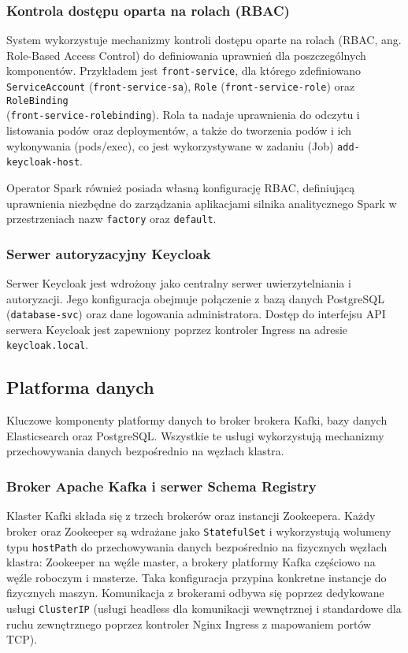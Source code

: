 \subsubsection{Kontrola dostępu oparta na rolach (RBAC)}
System wykorzystuje mechanizmy kontroli dostępu oparte na rolach (RBAC, ang. Role-Based Access Control) do definiowania uprawnień dla poszczególnych komponentów. Przykładem jest \texttt{front-service}, dla którego zdefiniowano \texttt{ServiceAccount} (\texttt{front-service-sa}), \texttt{Role} (\texttt{front-service-role}) oraz \texttt{RoleBinding} \\ (\texttt{front-service-rolebinding}). Rola ta nadaje uprawnienia do odczytu i listowania podów oraz deploymentów, a także do tworzenia podów i ich wykonywania (pods/exec), co jest wykorzystywane w zadaniu (Job) \texttt{add-keycloak-host}.

Operator Spark również posiada własną konfigurację RBAC, definiującą uprawnienia niezbędne do zarządzania aplikacjami silnika analitycznego Spark w przestrzeniach nazw \texttt{factory} oraz \texttt{default}.

\subsubsection{Serwer autoryzacyjny Keycloak}
Serwer Keycloak jest wdrożony jako centralny serwer uwierzytelniania i autoryzacji. Jego konfiguracja obejmuje połączenie z bazą danych PostgreSQL (\texttt{database-svc}) oraz dane logowania administratora. Dostęp do interfejsu API serwera Keycloak jest zapewniony poprzez kontroler Ingress na adresie \texttt{keycloak.local}.

\subsection{Platforma danych}

Kluczowe komponenty platformy danych to broker brokera Kafki, bazy danych Elasticsearch oraz PostgreSQL. Wszystkie te usługi wykorzystują mechanizmy przechowywania danych bezpośrednio na węzłach klastra.

\subsubsection{Broker Apache Kafka i serwer Schema Registry}
Klaster Kafki składa się z trzech brokerów oraz instancji Zookeepera. Każdy broker oraz Zookeeper są wdrażane jako \texttt{StatefulSet} i wykorzystują wolumeny typu \texttt{hostPath} do przechowywania danych bezpośrednio na fizycznych węzłach klastra: Zookeeper na węźle master, a brokery platformy Kafka częściowo na węźle roboczym i masterze. Taka konfiguracja przypina konkretne instancje do fizycznych maszyn. Komunikacja z brokerami odbywa się poprzez dedykowane usługi \texttt{ClusterIP} (usługi headless dla komunikacji wewnętrznej i standardowe dla ruchu zewnętrznego poprzez kontroler Nginx Ingress z mapowaniem portów TCP).

